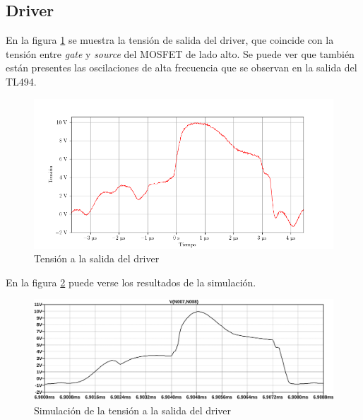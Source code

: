 




\subsection{Driver}

En la figura \ref{fig:driver_vout_connected} se muestra la tensión de salida del driver, que coincide con la tensión entre \textit{gate} y \textit{source} del MOSFET de lado alto.
Se puede ver que también están presentes las oscilaciones de alta frecuencia que se observan en la salida del TL494.

\begin{figure}[H]
    \centering
    \includegraphics[width=\textwidth]{images/capturas-osciloscopio/17-11-2022/31.png} %
    \caption{Tensión a la salida del driver}
    \label{fig:driver_vout_connected}
\end{figure}

En la figura \ref{fig:sim:driver_vout_connected} puede verse los resultados de la simulación.

\begin{figure}[H]
    \centering
    \includegraphics[width=\textwidth]{images/sim/15.pdf}
    \caption{Simulación de la tensión a la salida del driver}
    \label{fig:sim:driver_vout_connected}
\end{figure}

